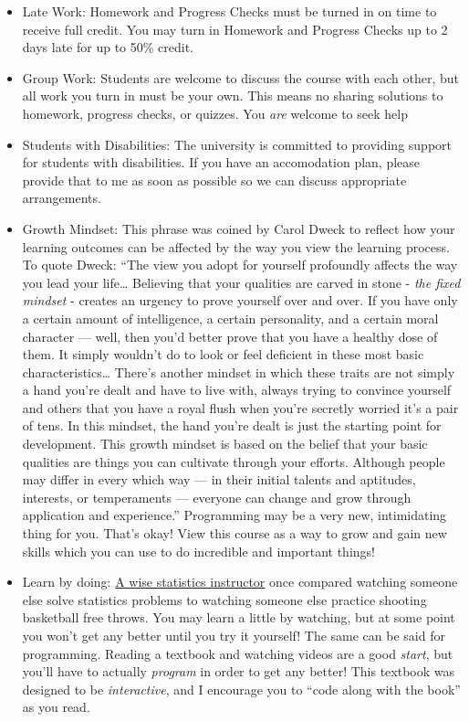 \documentclass[
]{article}
\providecommand{\tightlist}{%
  \setlength{\itemsep}{0pt}\setlength{\parskip}{0pt}}
\begin{document}
\begin{itemize}
\tightlist
\item
  Late Work: Homework and Progress Checks must be turned in on time to receive full credit. You may turn in Homework and Progress Checks up to 2 days late for up to 50\% credit.
\item
  Group Work: Students are welcome to discuss the course with each other, but all work you turn in must be your own. This means no sharing solutions to homework, progress checks, or quizzes. You \emph{are} welcome to seek help
\item
  Students with Disabilities: The university is committed to providing support for students with disabilities. If you have an accomodation plan, please provide that to me as soon as possible so we can discuss appropriate arrangements.
\item
  Growth Mindset: This phrase was coined by Carol Dweck to reflect how your learning outcomes can be affected by the way you view the learning process. To quote Dweck: ``The view you adopt for yourself profoundly affects the way you lead your life\ldots{} Believing that your qualities are carved in stone - \emph{the fixed mindset} - creates an urgency to prove yourself over and over. If you have only a certain amount of intelligence, a certain personality, and a certain moral character --- well, then you'd better prove that you have a healthy dose of them. It simply wouldn't do to look or feel deficient in these most basic characteristics\ldots{} There's another mindset in which these traits are not simply a hand you're dealt and have to live with, always trying to convince yourself and others that you have a royal flush when you're secretly worried it's a pair of tens. In this mindset, the hand you're dealt is just the starting point for development. This growth mindset is based on the belief that your basic qualities are things you can cultivate through your efforts. Although people may differ in every which way --- in their initial talents and aptitudes, interests, or temperaments --- everyone can change and grow through application and experience.'' Programming may be a very new, intimidating thing for you. That's okay! View this course as a way to grow and gain new skills which you can use to do incredible and important things!
\item
  Learn by doing: \href{https://statistics.colostate.edu/person/?id=B0D2F899C79C05AAE4EDBA6EE2FECACA\&sq=t}{A wise statistics instructor} once compared watching someone else solve statistics problems to watching someone else practice shooting basketball free throws. You may learn a little by watching, but at some point you won't get any better until you try it yourself! The same can be said for programming. Reading a textbook and watching videos are a good \emph{start}, but you'll have to actually \emph{program} in order to get any better! This textbook was designed to be \emph{interactive}, and I encourage you to ``code along with the book'' as you read.
\end{itemize}
\end{document}
